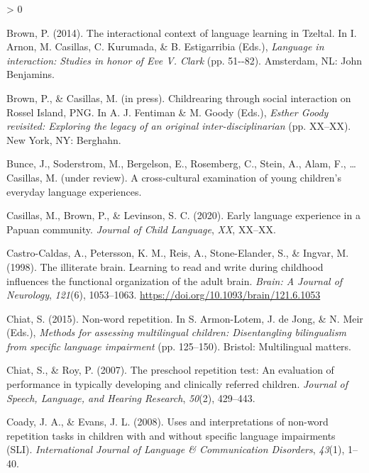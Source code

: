 \documentclass[
  american,
  ,man,floatsintext]{apa6}
\newlength{\cslhangindent}
\newenvironment{CSLReferences}[2] %
 {%
  \setlength{\parindent}{0pt}
  \ifodd #1 \everypar{\setlength{\hangindent}{\cslhangindent}}\ignorespaces\fi
  \ifnum #2 > 0
  \setlength{\parskip}{#2\baselineskip}
  \fi
 }%
 {}
\begin{document}
\begin{CSLReferences}{1}{0}
\leavevmode\hypertarget{ref-brown2014interactional}{}%
Brown, P. (2014). The interactional context of language learning in {T}zeltal. In I. Arnon, M. Casillas, C. Kurumada, \& B. Estigarribia (Eds.), \emph{Language in interaction: Studies in honor of {Eve V. Clark}} (pp. 51-\/-82). Amsterdam, NL: John Benjamins.

\leavevmode\hypertarget{ref-brownIPchildrearing}{}%
Brown, P., \& Casillas, M. (in press). Childrearing through social interaction on {Rossel Island, PNG}. In A. J. Fentiman \& M. Goody (Eds.), \emph{{Esther Goody} revisited: Exploring the legacy of an original inter-disciplinarian} (pp. XX--XX). New York, NY: Berghahn.

\leavevmode\hypertarget{ref-bunceURcrosscultural}{}%
Bunce, J., Soderstrom, M., Bergelson, E., Rosemberg, C., Stein, A., Alam, F., \ldots{} Casillas, M. (under review). A cross-cultural examination of young children's everyday language experiences.

\leavevmode\hypertarget{ref-casillas2020early}{}%
Casillas, M., Brown, P., \& Levinson, S. C. (2020). {Early language experience in a Papuan community}. \emph{Journal of Child Language}, \emph{XX}, XX--XX.

\leavevmode\hypertarget{ref-castro1998illiterate}{}%
Castro-Caldas, A., Petersson, K. M., Reis, A., Stone-Elander, S., \& Ingvar, M. (1998). {The illiterate brain. Learning to read and write during childhood influences the functional organization of the adult brain.} \emph{Brain: A Journal of Neurology}, \emph{121}(6), 1053--1063. \url{https://doi.org/10.1093/brain/121.6.1053}

\leavevmode\hypertarget{ref-chiat2015nonword}{}%
Chiat, S. (2015). Non-word repetition. In S. Armon-Lotem, J. de Jong, \& N. Meir (Eds.), \emph{Methods for assessing multilingual children: Disentangling bilingualism from specific language impairment} (pp. 125--150). Bristol: Multilingual matters.

\leavevmode\hypertarget{ref-chiat2007preschool}{}%
Chiat, S., \& Roy, P. (2007). The preschool repetition test: An evaluation of performance in typically developing and clinically referred children. \emph{Journal of Speech, Language, and Hearing Research}, \emph{50}(2), 429--443.

\leavevmode\hypertarget{ref-coady2008uses}{}%
Coady, J. A., \& Evans, J. L. (2008). Uses and interpretations of non-word repetition tasks in children with and without specific language impairments (SLI). \emph{International Journal of Language \& Communication Disorders}, \emph{43}(1), 1--40.


\end{CSLReferences}
\end{document}
